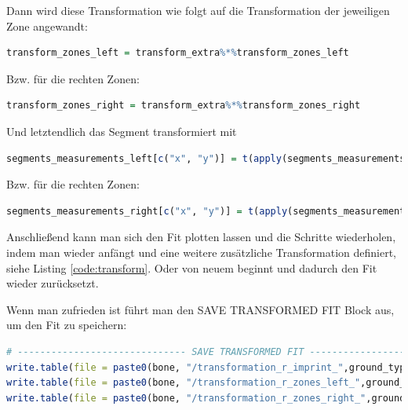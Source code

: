 \documentclass[a4paper, openany, oneside]{memoir}
\begin{document}
Dann wird diese Transformation wie folgt auf die Transformation der jeweiligen Zone angewandt:

\begin{minipage}[c]{\textwidth}
\begin{lstlisting}[language=R]
transform_zones_left = transform_extra%*%transform_zones_left 
\end{lstlisting}
\end{minipage}

Bzw. für die rechten Zonen:

\begin{minipage}[c]{\textwidth}
\begin{lstlisting}[language=R]
transform_zones_right = transform_extra%*%transform_zones_right 
\end{lstlisting}
\end{minipage}

Und letztendlich das Segment transformiert mit  

\begin{minipage}[c]{\textwidth}
\begin{lstlisting}[language=R]
segments_measurements_left[c("x", "y")] = t(apply(segments_measurements_left_orig, 1, trans_func, mat = transform_zones_left))
\end{lstlisting}
\end{minipage}

Bzw. für die rechten Zonen:

\begin{minipage}[c]{\textwidth}
\begin{lstlisting}[language=R]
segments_measurements_right[c("x", "y")] = t(apply(segments_measurements_right_orig, 1, trans_func, mat = transform_zones_right))
\end{lstlisting}
\end{minipage}

Anschließend kann man sich den Fit plotten lassen und die Schritte wiederholen, indem man wieder anfängt und eine weitere zusätzliche Transformation definiert, siehe Listing \ref{code:transform}. Oder von neuem beginnt und dadurch den Fit wieder zurücksetzt.

Wenn man zufrieden ist führt man den SAVE TRANSFORMED FIT Block aus, um den Fit zu speichern:


\begin{minipage}[c]{\textwidth}
\begin{lstlisting}[language=R]
# ------------------------------ SAVE TRANSFORMED FIT ----------------------------------------
write.table(file = paste0(bone, "/transformation_r_imprint_",ground_type, ".csv"), x= transform, row.names = FALSE, col.names=FALSE, sep=",")
write.table(file = paste0(bone, "/transformation_r_zones_left_",ground_type, ".csv"), x= transform_zones_left, row.names = FALSE, col.names=FALSE, sep=",")
write.table(file = paste0(bone, "/transformation_r_zones_right_",ground_type, ".csv"), x= transform_zones_right, row.names = FALSE, col.names=FALSE, sep=",")
\end{lstlisting}
\end{minipage}
\end{document}
